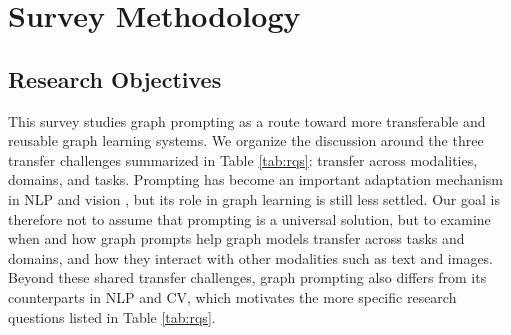 \section{Survey Methodology}\label{sec:method}

\subsection{Research Objectives}

This survey studies graph prompting as a route toward more transferable and reusable graph learning systems. We organize the discussion around the three transfer challenges summarized in Table \ref{tab:rqs}: transfer across modalities, domains, and tasks. Prompting has become an important adaptation mechanism in NLP and vision \cite{brown2020language, gao2021making,
wang2023chatvideo}, but its role in graph learning is still less settled. Our goal is therefore not to assume that prompting is a universal solution, but to examine when and how graph prompts help graph models transfer across tasks and domains, and how they interact with other modalities such as text and images. Beyond these shared transfer challenges, graph prompting also differs from its counterparts in NLP and CV, which motivates the more specific research questions listed in Table \ref{tab:rqs}.


